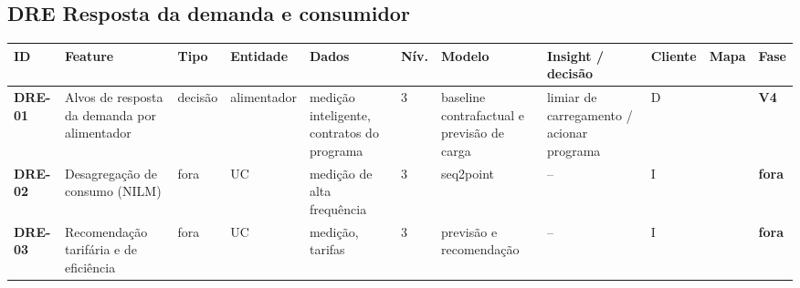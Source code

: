 \subsection*{DRE \textperiodcentered{} Resposta da demanda e consumidor}
\label{cat:DRE}
{\footnotesize\setlength{\tabcolsep}{3pt}
\begin{longtable}{@{}P{1.35cm}P{4.1cm}P{1.3cm}P{3.1cm}P{3.7cm}C{0.6cm}P{3.6cm}P{3.3cm}P{1.1cm}P{0.9cm}P{1.1cm}@{}}
\toprule
\textbf{ID} & \textbf{Feature} & \textbf{Tipo} & \textbf{Entidade} & \textbf{Dados} & \textbf{Nív.} & \textbf{Modelo} & \textbf{Insight / decisão} & \textbf{Cliente} & \textbf{Mapa} & \textbf{Fase} \\
\midrule\endhead
\textbf{DRE-01} & Alvos de resposta da demanda por alimentador & decisão & alimentador & medição inteligente, contratos do programa & 3 & baseline contrafactual e previsão de carga & limiar de carregamento / acionar programa & D &  & \colorbox{fV4}{\scriptsize \textbf{V4}} \\
\textbf{DRE-02} & Desagregação de consumo (NILM) & fora & UC & medição de alta frequência & 3 & seq2point & -- & I &  & \colorbox{fFora}{\scriptsize \textbf{fora}} \\
\textbf{DRE-03} & Recomendação tarifária e de eficiência & fora & UC & medição, tarifas & 3 & previsão e recomendação & -- & I &  & \colorbox{fFora}{\scriptsize \textbf{fora}} \\
\bottomrule
\end{longtable}}


